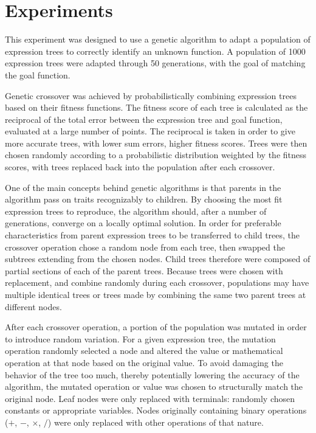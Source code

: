 
\section{Experiments}
\label{sec:expts}

This experiment was designed to use a genetic algorithm to adapt a population of expression trees to correctly identify an unknown function.  A population of 1000 expression trees were adapted through 50 generations, with the goal of matching the goal function. 

Genetic crossover was achieved by probabilistically combining expression trees based on their fitness functions.  The fitness score of each tree is calculated as the reciprocal of the total error between the expression tree and goal function, evaluated at a large number of points.  The reciprocal is taken in order to give more accurate trees, with lower sum errors, higher fitness scores.  Trees were then chosen randomly according to a probabilistic distribution weighted by the fitness scores, with trees replaced back into the population after each crossover.

One of the main concepts behind genetic algorithms is that parents in the algorithm pass on traits recognizably to children.  By choosing the most fit expression trees to reproduce, the algorithm should, after a number of generations, converge on a locally optimal solution. In order for preferable characteristics from parent expression trees to be transferred to child trees, the crossover operation chose a random node from each tree, then swapped the subtrees extending from the chosen nodes.  Child trees therefore were composed of partial sections of each of the parent trees.  Because trees were chosen with replacement, and combine randomly during each crossover, populations may have multiple identical trees or trees made by combining the same two parent trees at different nodes.

After each crossover operation, a portion of the population was mutated in order to introduce random variation. For a given expression tree, the mutation operation randomly selected a node and altered the value or mathematical operation at that node based on the original value.  To avoid damaging the behavior of the tree too much, thereby potentially lowering the accuracy of the algorithm, the mutated operation or value was chosen to structurally match the original node.  Leaf nodes were only replaced with terminals: randomly chosen constants or appropriate variables.  Nodes originally containing binary operations ($+$, $-$, $\times$, $/$) were only replaced with other operations of that nature.


